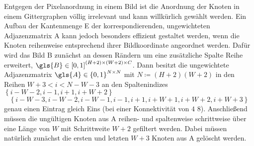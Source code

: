Entgegen der Pixelanordnung in einem Bild ist die Anordnung der Knoten in einem Gittergraphen völlig irrelevant und kann willkürlich gewählt werden.
Ein Aufbau der Kantenmenge \gls{E} \bzw{} der korrespondierenden, ungewichteten Adjazenzmatrix \gls{A} kann jedoch besonders effizient gestaltet werden, wenn die Knoten reihenweise entsprechend ihrer Bildkoordinate angeordnet werden.
Dafür wird das Bild \gls{B} zunächst an dessen Rändern um eine zusätzliche Spalte \bzw{} Reihe erweitert, \dhe{} $\gls{B} \in {\left[0, 1\right]}^{\left(H + 2\right) \times \left(W + 2\right) \times C}$.
Dann besitzt die ungewichtete Adjazenzmatrix $\gls{A} \in {\left\{0, 1\right\}}^{N \times N}$ mit $N \coloneqq \left(H+2\right)\left(W+2\right)$ in den Reihen $W+3 < i < N - W - 3$ an den Spaltenindizes $\left\{i-W-2, i-1, i+1, i+W+2\right\}$ \bzw{}
\begin{equation*}
  \left\{i-W-3, i-W-2, i-W-1, i-1, i+1, i+W+1, i+W+2, i+W+3\right\}
\end{equation*}
genau einen Eintrag gleich Eins (bei einer Konnektivität von $4$ \bzw{} $8$).
Anschließend müssen die ungültigen Knoten aus \gls{A} reihen- und spaltenweise schrittweise über eine Länge von $W$ mit Schrittweite $W+2$ gefiltert werden.
Dabei müssen natürlich zunächst die ersten und letzten $W + 3$ Knoten aus \gls{A} gelöscht werden.
